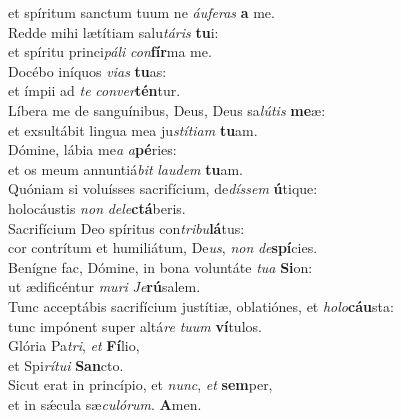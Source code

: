 \evenverse et spíritum sanctum tuum ne \textit{áu}\textit{fe}\textit{ras} \textbf{a} me.\\
\oddverse Redde mihi lætítiam salu\textit{tá}\textit{ris} \textbf{tu}i:~\*\\
\oddverse et spíritu princi\textit{pá}\textit{li} \textit{con}\textbf{fír}ma me.\\
\evenverse Docébo iníquos \textit{vi}\textit{as} \textbf{tu}as:~\*\\
\evenverse et ímpii ad \textit{te} \textit{con}\textit{ver}\textbf{tén}tur.\\
\oddverse Líbera me de sanguínibus, Deus, Deus sa\textit{lú}\textit{tis} \textbf{me}æ:~\*\\
\oddverse et exsultábit lingua mea ju\textit{stí}\textit{ti}\textit{am} \textbf{tu}am.\\
\evenverse Dómine, lábia me\textit{a} \textit{a}\textbf{pé}ries:~\*\\
\evenverse et os meum annuntiá\textit{bit} \textit{lau}\textit{dem} \textbf{tu}am.\\
\oddverse Quóniam si voluísses sacrifícium, de\textit{dís}\textit{sem} \textbf{ú}tique:~\*\\
\oddverse holocáustis \textit{non} \textit{de}\textit{le}\textbf{ctá}beris.\\
\evenverse Sacrifícium Deo spíritus con\textit{tri}\textit{bu}\textbf{lá}tus:~\*\\
\evenverse cor contrítum et humiliátum, De\textit{us}, \textit{non} \textit{de}\textbf{spí}cies.\\
\oddverse Benígne fac, Dómine, in bona voluntáte \textit{tu}\textit{a} \textbf{Si}on:~\*\\
\oddverse ut ædificéntur \textit{mu}\textit{ri} \textit{Je}\textbf{rú}salem.\\
\evenverse Tunc acceptábis sacrifícium justítiæ, oblatiónes, et \textit{ho}\textit{lo}\textbf{cáu}sta:~\*\\
\evenverse tunc impónent super altá\textit{re} \textit{tu}\textit{um} \textbf{ví}tulos.\\
\oddverse Glória Pa\textit{tri}, \textit{et} \textbf{Fí}lio,~\*\\
\oddverse et Spi\textit{rí}\textit{tu}\textit{i} \textbf{San}cto.\\
\evenverse Sicut erat in princípio, et \textit{nunc}, \textit{et} \textbf{sem}per,~\*\\
\evenverse et in sǽcula sæ\textit{cu}\textit{ló}\textit{rum}. \textbf{A}men.\\

